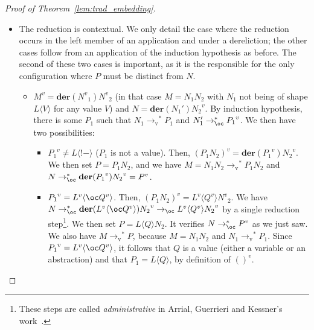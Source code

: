 \documentclass[10pt,a4paper]{article}
\newcommand{\<}{\langle}
\renewcommand{\>}{\rangle}
\newcommand{\der}[1]{\ensuremath{\mathbf{der}(#1)}}
\newcommand{\tov}{\ensuremath{\to_{\text{v}}}}
\newcommand{\todbf}{\to_{\oc}} %
\newcommand{\tradv}[1]{\ensuremath{{#1}^v}}
\begin{document}
\begin{proof}[Proof of Theorem~\ref{lem:trad_embedding}]
\begin{itemize}
			$N=\tradv{(L\<N_1\{N_2/x\})}$. We then set
			$P=L\<N_1\{N_2/x\}\>$.
		\item The reduction is contextual. We only detail the case where
			the reduction occurs in the left member of an
			application and under a dereliction; the other
			cases follow from an application
			of the induction hypothesis as before. The second of
			these two cases is
			important, as it is the responsible for the only
			configuration where $P$ must be distinct from $N$.
			\begin{itemize}
				\item $\tradv M=\der{\tradv N_1}\tradv N_2$ (in
					that case $M=N_1N_2$ with $N_1$ not
					being of shape $L\<V\>$ for any value
					$V$) and $N=\der{N_1'}\tradv{N_2}$. By
					induction hypothesis, there is some
					$P_1$ such that $N_1\tov^*P_1$ and
					$N_1'\todbf^*\tradv{P_1}$. We then have two
					possibilities:
					\begin{itemize}
						\item $\tradv{P_1}\neq L\<!-\>$
							($P_1$ is not a value).
							Then,
							$\tradv{(P_1N_2)}=\der{\tradv{P_1}}\tradv{N_2}$.
							We then set $P=P_1N_2$,
							and we have
							$M=N_1N_2\tov^*P_1N_2$
							and
							$N\todbf^*\der{\tradv{P_1}}\tradv{N_2}=\tradv
							P$.
						\item $\tradv{P_1}=\tradv L\<\oc
							\tradv Q\>$. Then,
							$\tradv{(P_1N_2)}=
							\tradv L\<\tradv Q\>\tradv
							N_2$. We have $N\todbf^*\der{\tradv
                                                       L\<\oc\tradv
                                                       Q\>}\tradv{N_2}\todbf\tradv L\<\tradv Q\>\tradv{N_2}$ 
                                                       by a single reduction
                                                       step\footnote{
                                                               These steps are called \emph{administrative}
                                                               in Arrial, Guerrieri and Kessner's
                                                               work~\cite{arrial-diligence}.
                                                       }. We then set $P=L\< Q\>N_2$.
                                                       It verifies $N\todbf^*\tradv P$ as we
                                                       just saw. We also have
							$M\tov^* P$, because
                                                       $M=N_1N_2$ and $N_1\tov^*P_1$.
                                                       Since $\tradv{P_1}=\tradv
                                                       L\<\oc\tradv Q\>$, it follows that
                                                       $Q$ is a value (either a variable
                                                       or an abstraction) and that
                                                       $P_1=L\<Q\>$, by definition of
                                                       $\tradv{()}$. \qedhere
					\end{itemize}


\end{itemize}
\end{itemize}
\end{proof}
\end{document}
